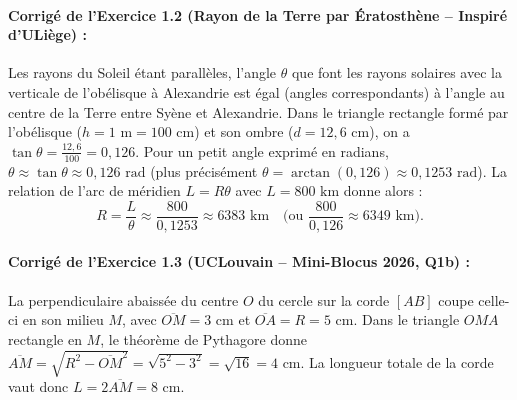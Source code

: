 \paragraph{Corrigé de l'Exercice 1.2 (Rayon de la Terre par Ératosthène -- Inspiré d'ULiège) :}
Les rayons du Soleil étant parallèles, l'angle $\theta$ que font les rayons solaires avec la verticale de l'obélisque à Alexandrie est égal (angles correspondants) à l'angle au centre de la Terre entre Syène et Alexandrie. Dans le triangle rectangle formé par l'obélisque ($h = 1\text{ m} = 100\text{ cm}$) et son ombre ($d = 12,6\text{ cm}$), on a $\tan\theta = \frac{12,6}{100} = 0,126$. Pour un petit angle exprimé en radians, $\theta \approx \tan\theta \approx 0,126\text{ rad}$ (plus précisément $\theta = \arctan(0,126) \approx 0,1253\text{ rad}$). La relation de l'arc de méridien $L = R\theta$ avec $L = 800\text{ km}$ donne alors :
\[
    R = \frac{L}{\theta} \approx \frac{800}{0,1253} \approx \boxed{6383\text{ km}} \quad \text{(ou } \frac{800}{0,126} \approx 6349\text{ km)}.
\]

\paragraph{Corrigé de l'Exercice 1.3 (UCLouvain -- Mini-Blocus 2026, Q1b) :}
La perpendiculaire abaissée du centre $O$ du cercle sur la corde $[AB]$ coupe celle-ci en son milieu $M$, avec $\overline{OM} = 3\text{ cm}$ et $\overline{OA} = R = 5\text{ cm}$. Dans le triangle $OMA$ rectangle en $M$, le théorème de Pythagore donne $\overline{AM} = \sqrt{R^2 - \overline{OM}^2} = \sqrt{5^2 - 3^2} = \sqrt{16} = 4\text{ cm}$. La longueur totale de la corde vaut donc $L = 2\overline{AM} = \boxed{8\text{ cm}}$.

